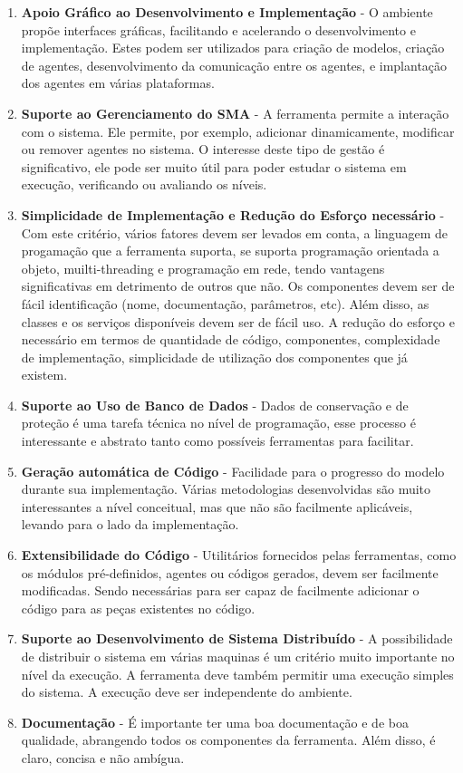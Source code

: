 \begin{enumerate}
\item \textbf{Apoio Gráfico ao Desenvolvimento e Implementação} - O ambiente propõe interfaces gráficas, facilitando e acelerando o desenvolvimento e implementação. Estes podem ser utilizados para criação de modelos, criação de agentes, desenvolvimento da comunicação entre os agentes, e implantação dos agentes em várias plataformas. 

\item \textbf{Suporte ao Gerenciamento do SMA} - A ferramenta permite a interação com o sistema. Ele permite, por exemplo, adicionar dinamicamente, modificar ou remover agentes no sistema. O interesse deste tipo de gestão é significativo, ele pode ser muito útil para poder estudar o sistema em execução, verificando ou avaliando os níveis.  

\item \textbf{Simplicidade de Implementação e Redução do Esforço necessário} - Com este critério, vários fatores devem ser levados em conta, a linguagem de progamação que a ferramenta suporta, se suporta programação orientada a objeto, muilti-threading e programação em rede, tendo vantagens significativas em detrimento de outros que não. Os componentes devem ser de fácil identificação (nome, documentação, parâmetros, etc). Além disso, as classes e os serviços disponíveis devem ser de fácil uso. A redução do esforço e necessário em termos de quantidade de código, componentes, complexidade de implementação, simplicidade de utilização dos componentes que já existem.


\item \textbf{Suporte ao Uso de Banco de Dados} - Dados de conservação e de proteção é uma tarefa técnica no nível de programação, esse processo é interessante e abstrato tanto como possíveis ferramentas para facilitar.  

\item \textbf{Geração automática de Código} - Facilidade para o progresso do modelo durante sua implementação. Várias metodologias desenvolvidas são muito interessantes a nível conceitual, mas que não são facilmente aplicáveis, levando para o lado da implementação.  

\item \textbf{Extensibilidade do Código} - Utilitários fornecidos pelas ferramentas, como os módulos pré-definidos, agentes ou códigos gerados, devem ser facilmente modificadas. Sendo necessárias para ser capaz de facilmente adicionar o código para as peças existentes no código.

\item \textbf{Suporte ao Desenvolvimento de Sistema Distribuído} - A possibilidade de distribuir o sistema em várias maquinas é um critério muito importante no nível da execução. A ferramenta deve também permitir uma execução simples do sistema. A execução deve ser independente do ambiente. 

\item \textbf{Documentação} - É importante ter uma boa documentação e de boa qualidade, abrangendo todos os componentes da ferramenta. Além disso, é claro, concisa e não ambígua.
\end{enumerate}
 
